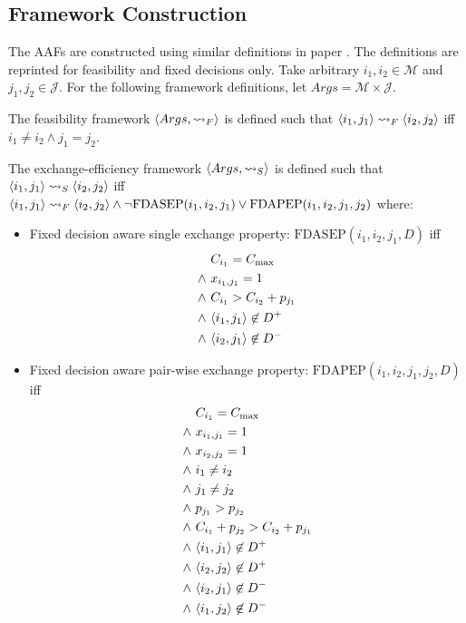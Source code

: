 \subsection{Framework Construction}
\label{frameworkconstruction}

The AAFs are constructed using similar definitions in paper \cite{aes}. The definitions are reprinted for feasibility and fixed decisions only. Take arbitrary $i_1,i_2\in\mathcal{M}$ and $j_1,j_2\in\mathcal{J}$. For the following framework definitions, let $Args=\mathcal{M}\times\mathcal{J}$.

\begin{definition}
	\label{feasibilityframework}
	
	The feasibility framework $\langle{Args},{\rightsquigarrow_F}\rangle$ is defined such that $\langle{i_1},{j_1}\rangle\rightsquigarrow_F\langle{i_2},{j_2}\rangle$ iff $i_1\neq i_2\land j_1=j_2$.
\end{definition}

\begin{definition}
	\label{exchangefficiencyframework}

	The exchange-efficiency framework $\langle{Args},{\rightsquigarrow_S}\rangle$ is defined such that $\langle{i_1},{j_1}\rangle\rightsquigarrow_S\langle{ i_2},{j_2}\rangle$ iff $\langle{i_1},{j_1}\rangle\rightsquigarrow_F\langle{i_2},{j_2}\rangle\land\neg\text{FDASEP}(i_1,i_2,j_1)\lor\text{FDAPEP}(i_1,i_2,j_1,j_2)$ where:
	\begin{itemize}
		\item Fixed decision aware single exchange property: $\text{FDASEP}(i_1,i_2,j_1, D)$ iff
			\begin{align*}
				&C_{i_1}=C_{\max}\\
				\land\ &x_{i_1,j_1}=1\\
				\land\ &C_{i_1}>C_{i_2}+p_{j_1}\\
				\land\ &\langle{i_1},{j_1}\rangle\not\in D^+\\
				\land\ &\langle{i_2},{j_1}\rangle\not\in D^-
			\end{align*}
		\item Fixed decision aware pair-wise exchange property: $\text{FDAPEP}(i_1,i_2,j_1,j_2, D)$ iff
			\begin{align*}
				&C_{i_1}=C_{\max}\\
				\land\ &x_{i_1,j_1}=1\\
				\land\ &x_{i_2,j_2}=1\\
				\land\ &i_1\neq i_2\\
				\land\ &j_1\neq j_2\\
				\land\ &p_{j_1}>p_{j_2}\\
				\land\ &C_{i_1}+p_{j_2}>C_{i_2}+p_{j_1}\\
				\land\ &\langle{i_1},{j_1}\rangle\not\in D^+\\
				\land\ &\langle{i_2},{j_2}\rangle\not\in D^+\\
				\land\ &\langle{i_2},{j_1}\rangle\not\in D^-\\
				\land\ &\langle{i_1},{j_2}\rangle\not\in D^-
			\end{align*}
	\end{itemize}
\end{definition}

